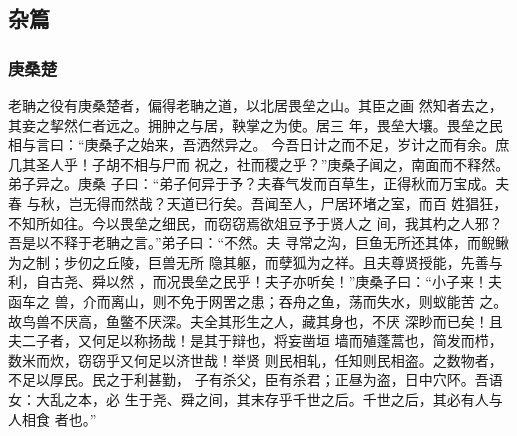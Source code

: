 \documentclass[]{article}
\begin{document}
\hypertarget{header-n878}{%
\subsection{杂篇}\label{header-n878}}

\hypertarget{header-n879}{%
\subsubsection{庚桑楚}\label{header-n879}}

老聃之役有庚桑楚者，偏得老聃之道，以北居畏垒之山。其臣之画
然知者去之，其妾之挈然仁者远之。拥肿之与居，鞅掌之为使。居三
年，畏垒大壤。畏垒之民相与言曰：``庚桑子之始来，吾洒然异之。
今吾日计之而不足，岁计之而有余。庶几其圣人乎！子胡不相与尸而
祝之，社而稷之乎？''庚桑子闻之，南面而不释然。弟子异之。庚桑
子曰：``弟子何异于予？夫春气发而百草生，正得秋而万宝成。夫春
与秋，岂无得而然哉？天道已行矣。吾闻至人，尸居环堵之室，而百
姓猖狂，不知所如往。今以畏垒之细民，而窃窃焉欲俎豆予于贤人之
间，我其杓之人邪？吾是以不释于老聃之言。''弟子曰：``不然。夫
寻常之沟，巨鱼无所还其体，而鲵鳅为之制；步仞之丘陵，巨兽无所
隐其躯，而孽狐为之祥。且夫尊贤授能，先善与利，自古尧、舜以然
，而况畏垒之民乎！夫子亦听矣！''庚桑子曰：``小子来！夫函车之
兽，介而离山，则不免于网罟之患；吞舟之鱼，荡而失水，则蚁能苦
之。故鸟兽不厌高，鱼鳖不厌深。夫全其形生之人，藏其身也，不厌
深眇而已矣！且夫二子者，又何足以称扬哉！是其于辩也，将妄凿垣
墙而殖蓬蒿也，简发而栉，数米而炊，窃窃乎又何足以济世哉！举贤
则民相轧，任知则民相盗。之数物者，不足以厚民。民之于利甚勤，
子有杀父，臣有杀君；正昼为盗，日中穴阫。吾语女：大乱之本，必
生于尧、舜之间，其末存乎千世之后。千世之后，其必有人与人相食 者也。''
\end{document}
